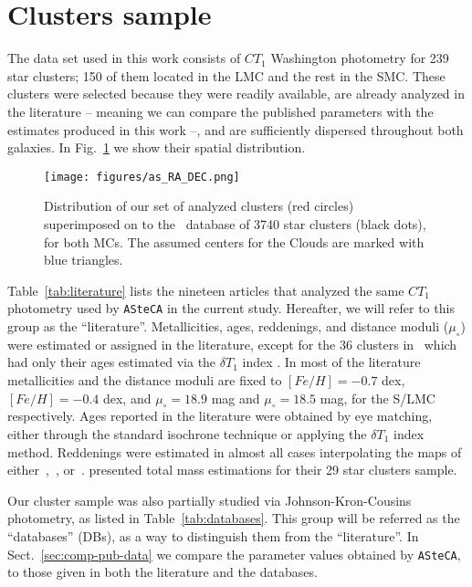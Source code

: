 \documentclass{aa}
\begin{document}

\section{Clusters sample}
\label{sec:clust-sample}

The data set used in this work consists of $CT_1$ Washington photometry for 239
star clusters; 150 of them located in the LMC and the rest in the SMC.\@
%
These clusters were selected because they were readily available, are
already analyzed in the literature -- meaning we can compare the published
parameters with the estimates produced in this work --, and are sufficiently
dispersed throughout both galaxies.
%
In Fig.~\ref{fig:ra-dec} we show their spatial distribution.

\begin{figure}
\centering
\texttt{[image: figures/as\_RA\_DEC.png]}
\caption{Distribution of our set of analyzed clusters (red circles)
superimposed on to the~\cite{Bica_2008} database of 3740 star clusters (black
dots), for both MCs. The assumed centers for the Clouds are marked with blue
triangles.}
\label{fig:ra-dec}
\end{figure}

Table~\ref{tab:literature} lists the nineteen articles that analyzed the same
$CT_1$ photometry used by \texttt{ASteCA} in the current study. Hereafter, we
will refer to this group as the ``literature''.
%
Metallicities, ages, reddenings, and distance moduli ($\mu_{\circ}$)
were estimated or assigned in the literature, except for the 36
clusters in~\cite{Piatti_2011b} which had only their ages estimated
via the $\delta T_1$ index \citep{Phelps_1994,Geisler_1997}.
%
In most of the literature metallicities and the distance moduli are fixed to
$[Fe/H]{=}-0.7$ dex, $[Fe/H]{=}-0.4$ dex, and $\mu_{\circ}{=}18.9$ mag and
$\mu_{\circ}{=}18.5$ mag, for the S/LMC respectively.
Ages reported in the literature were obtained by eye matching, either through
the standard isochrone technique or applying the $\delta T_1$ index method.
Reddenings were estimated in almost all cases interpolating the maps
of either~\cite{Burstein_1982},~\cite{Schlegel_1998}, or~\cite{Haschke_2011}.
%
\cite{Maia_2013} presented total mass estimations for their 29 star clusters
sample.

Our cluster sample was also partially studied via Johnson-Kron-Cousins
photometry, as listed in Table~\ref{tab:databases}. This group will be referred
as the ``databases'' (DBs), as a way to distinguish them from the
``literature''. In Sect.~\ref{sec:comp-pub-data} we compare the parameter
values obtained by \texttt{ASteCA}, to those given in both the literature and
the databases.
\end{document}
